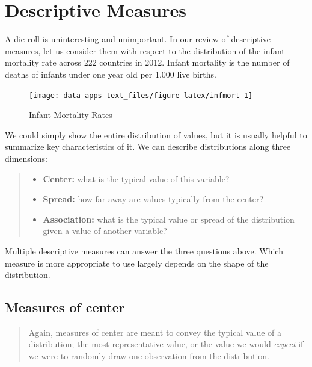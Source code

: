 \documentclass[
]{book}
\providecommand{\tightlist}{%
  \setlength{\itemsep}{0pt}\setlength{\parskip}{0pt}}
\begin{document}
\hypertarget{descriptive-measures}{%
\section{Descriptive Measures}\label{descriptive-measures}}

A die roll is uninteresting and unimportant. In our review of descriptive measures, let us consider them with respect to the distribution of the infant mortality rate across 222 countries in 2012. Infant mortality is the number of deaths of infants under one year old per 1,000 live births.

\begin{figure}

{\centering \texttt{[image: data-apps-text\_files/figure-latex/infmort-1]} 

}

\caption{Infant Mortality Rates}\label{fig:infmort}
\end{figure}

We could simply show the entire distribution of values, but it is usually helpful to summarize key characteristics of it. We can describe distributions along three dimensions:

\begin{quote}
\begin{itemize}
\tightlist
\item
  \textbf{Center:} what is the typical value of this variable?
\item
  \textbf{Spread:} how far away are values typically from the center?
\item
  \textbf{Association:} what is the typical value or spread of the distribution given a value of another variable?
\end{itemize}
\end{quote}

Multiple descriptive measures can answer the three questions above. Which measure is more appropriate to use largely depends on the shape of the distribution.

\hypertarget{measures-of-center}{%
\subsection{Measures of center}\label{measures-of-center}}

\begin{quote}
Again, measures of center are meant to convey the typical value of a distribution; the most representative value, or the value we would \emph{expect} if we were to randomly draw one observation from the distribution.
\end{quote}
\end{document}
